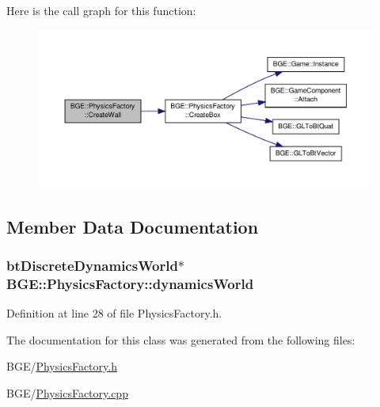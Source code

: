 Here is the call graph for this function\-:
\nopagebreak
\begin{figure}[H]
\begin{center}
\leavevmode
\includegraphics[width=350pt]{class_b_g_e_1_1_physics_factory_a0a1aef2a5769b29ef74654ea3665637b_cgraph}
\end{center}
\end{figure}




\subsection{Member Data Documentation}
\hypertarget{class_b_g_e_1_1_physics_factory_a46bbcd5b2abd9ec8f1ca8fd04bff9b61}{
\subsubsection[{dynamics\-World}]{\setlength{\rightskip}{0pt plus 5cm}bt\-Discrete\-Dynamics\-World$\ast$ B\-G\-E\-::\-Physics\-Factory\-::dynamics\-World}}\label{class_b_g_e_1_1_physics_factory_a46bbcd5b2abd9ec8f1ca8fd04bff9b61}


Definition at line 28 of file Physics\-Factory.\-h.



The documentation for this class was generated from the following files\-:\begin{DoxyCompactItemize}
\item 
B\-G\-E/\hyperlink{_physics_factory_8h}{Physics\-Factory.\-h}\item 
B\-G\-E/\hyperlink{_physics_factory_8cpp}{Physics\-Factory.\-cpp}\end{DoxyCompactItemize}
